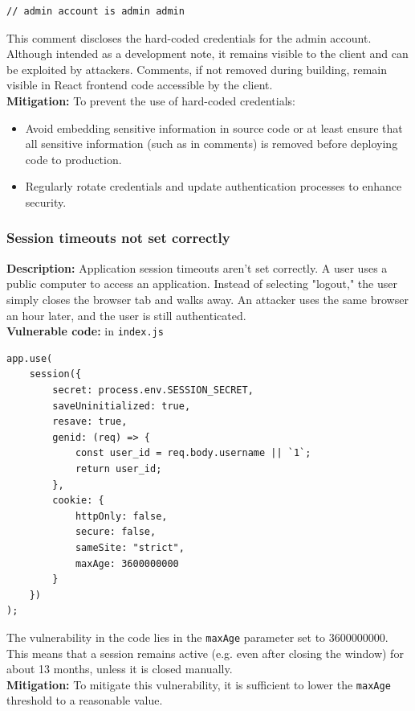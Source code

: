 \documentclass[]{article}
\begin{document}
\begin{lstlisting}
// admin account is admin admin
\end{lstlisting}
This comment discloses the hard-coded credentials for the admin account. Although intended as a development note, it remains visible to the client and can be exploited by attackers. Comments, if not removed during building, remain visible in React frontend code accessible by the client. \\ 
\textbf{Mitigation:}
To prevent the use of hard-coded credentials:
\begin{itemize}
    \item Avoid embedding sensitive information in source code or at least ensure that all sensitive information (such as in comments) is removed before deploying code to production.
    \item Regularly rotate credentials and update authentication processes to enhance security.
\end{itemize}

\subsubsection{Session timeouts not set correctly}
\textbf{Description:} Application session timeouts aren't set correctly. A user uses a public computer to access an application. Instead of selecting "logout," the user simply closes the browser tab and walks away. An attacker uses the same browser an hour later, and the user is still authenticated. \\
\textbf{Vulnerable code:} in \texttt{index.js}
\begin{lstlisting}
app.use(
    session({
        secret: process.env.SESSION_SECRET,
        saveUninitialized: true,
        resave: true,
        genid: (req) => {
            const user_id = req.body.username || `1`;
            return user_id;
        },
        cookie: {
            httpOnly: false,
            secure: false,
            sameSite: "strict",
            maxAge: 3600000000
        }
    })
);
\end{lstlisting}
The vulnerability in the code lies in the \texttt{maxAge} parameter set to 3600000000. This means that a session remains active (e.g. even after closing the window) for about 13 months, unless it is closed manually.
\\ \textbf{Mitigation:} To mitigate this vulnerability, it is sufficient to lower the \texttt{maxAge} threshold to a reasonable value.
\end{document}
